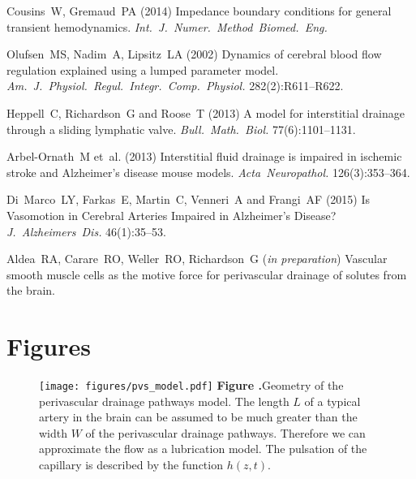 \documentclass{frontiersFPHY} %
\begin{document}
\begin{thebibliography}{10}
Cousins~W, Gremaud~PA (2014) Impedance boundary conditions for general transient hemodynamics. {\em Int.~J.~Numer.~Method~Biomed.~Eng.}
  
Olufsen~MS, Nadim~A, Lipsitz~LA (2002) Dynamics of cerebral blood flow regulation explained using a lumped parameter model. {\em Am.~J.~Physiol.~Regul.~Integr.~Comp.~Physiol.} 282(2):R611--R622.

Heppell~C, Richardson~G and Roose~T (2013) A model for interstitial drainage through a sliding lymphatic valve. {\em Bull.~Math.~Biol.} 77(6):1101--1131.

Arbel-Ornath~M et~al. (2013) Interstitial fluid drainage is impaired in ischemic stroke and Alzheimer's disease mouse models. {\em Acta~Neuropathol.} 126(3):353--364.

Di~Marco~LY, Farkas~E, Martin~C, Venneri~A and Frangi~AF (2015) Is Vasomotion in Cerebral Arteries Impaired in Alzheimer's Disease? {\em J.~Alzheimers~Dis.} 46(1):35--53.

Aldea~RA, Carare~RO, Weller~RO, Richardson~G ({\em in preparation}) Vascular smooth muscle cells as the motive force for perivascular drainage of solutes from the brain. 
\end{thebibliography}


\section*{Figures}


\begin{figure}[h!]
\centering
\texttt{[image: figures/pvs\_model.pdf]}
\textbf{\label{fig:pvs_model} Figure .}{Geometry of the perivascular drainage pathways model. The length $L$ of a typical artery in the brain can be assumed to be much greater than the width $W$ of the perivascular drainage pathways. Therefore we can approximate the flow as a lubrication model. The pulsation of the capillary is described by the function $h(z,t)$.}
\end{figure}
\end{document}

